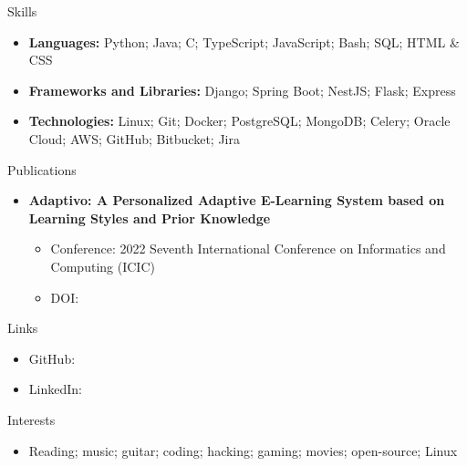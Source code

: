 \documentclass[garamond, a4paper]{modest-cv}
\begin{document}
	\begin{cvsection}{Skills}
		\begin{cvsubsection}{}{}{}{}
			\begin{itemize}
				\item \textbf{Languages:} Python; Java; C; TypeScript; JavaScript; Bash; SQL; HTML \& CSS
				\item \textbf{Frameworks and Libraries:} Django; Spring Boot; NestJS; Flask; Express
				\item \textbf{Technologies:} Linux; Git; Docker; PostgreSQL; MongoDB; Celery; Oracle Cloud; AWS; GitHub; Bitbucket; Jira
			\end{itemize}
		\end{cvsubsection}
	\end{cvsection}

	\begin{cvsection}{Publications}
		\begin{cvsubsection}{}{}{}{}
			\begin{itemize}
				\item \textbf{Adaptivo: A Personalized Adaptive E-Learning System based on Learning Styles and Prior Knowledge}
				\begin{itemize}
					\item Conference: 2022 Seventh International Conference on Informatics and Computing (ICIC)
					\item DOI: \ttfamily {}
				\end{itemize}
			\end{itemize}
		\end{cvsubsection}
	\end{cvsection}

	\begin{cvsection}{Links}
		\begin{cvsubsection}{}{}{}{}
			\begin{itemize}
				\item GitHub: \small {} \normalsize
				\item LinkedIn: \small {}
			\end{itemize}
		\end{cvsubsection}
	\end{cvsection}

	\begin{cvsection}{Interests}
		\begin{cvsubsection}{}{}{}{}
			\begin{itemize}
				\item Reading; music; guitar; coding; hacking; gaming; movies; open-source; Linux
			\end{itemize}
		\end{cvsubsection}
	\end{cvsection}
\end{document}
